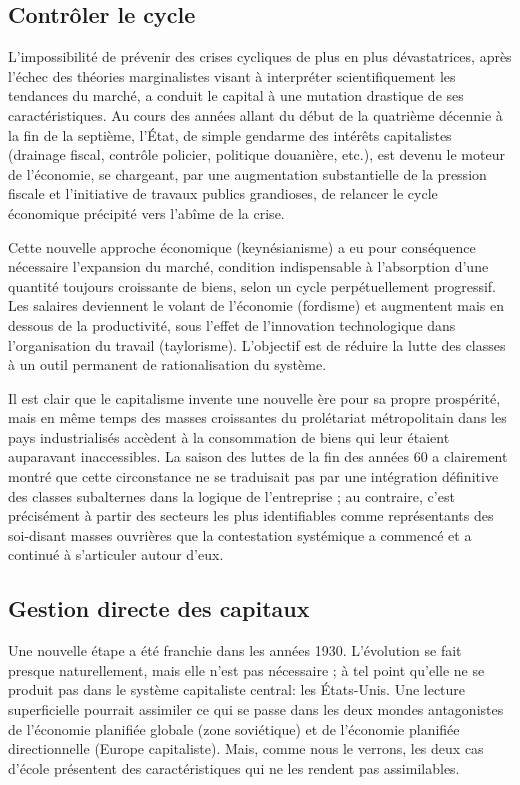 \subsection{Contrôler le cycle}

L'impossibilité de prévenir des crises cycliques de plus en plus dévastatrices, après l'échec des théories marginalistes visant à interpréter scientifiquement les tendances du marché, a conduit le capital à une mutation drastique de ses caractéristiques. Au cours des années allant du début de la quatrième décennie à la fin de la septième, l'État, de simple gendarme des intérêts capitalistes (drainage fiscal, contrôle policier, politique douanière, etc.), est devenu le moteur de l'économie, se chargeant, par une augmentation substantielle de la pression fiscale et l’initiative de travaux publics grandioses, de relancer le cycle économique précipité vers l'abîme de la crise.

Cette nouvelle approche économique (keynésianisme) a eu pour conséquence nécessaire l'expansion du marché, condition indispensable à l'absorption d'une quantité toujours croissante de biens, selon un cycle perpétuellement progressif. Les salaires deviennent le volant de l'économie (fordisme) et augmentent mais en dessous de la productivité, sous l'effet de l'innovation technologique dans l'organisation du travail (taylorisme). L'objectif est de réduire la lutte des classes à un outil permanent de rationalisation du système.

Il est clair que le capitalisme invente une nouvelle ère pour sa propre prospérité, mais en même temps des masses croissantes du prolétariat métropolitain dans les pays industrialisés accèdent à la consommation de biens qui leur étaient auparavant inaccessibles. La saison des luttes de la fin des années 60 a clairement montré que cette circonstance ne se traduisait pas par une intégration définitive des classes subalternes dans la logique de l'entreprise ; au contraire, c'est précisément à partir des secteurs les plus identifiables comme représentants des soi-disant masses ouvrières que la contestation systémique a commencé et a continué à s'articuler autour d'eux.

\subsection{Gestion directe des capitaux}

Une nouvelle étape a été franchie dans les années 1930. L'évolution se fait presque naturellement, mais elle n'est pas nécessaire ; à tel point qu'elle ne se produit pas dans le système capitaliste central: les États-Unis. Une lecture superficielle pourrait assimiler ce qui se passe dans les deux mondes antagonistes de l'économie planifiée globale (zone soviétique) et de l'économie planifiée directionnelle (Europe capitaliste). Mais, comme nous le verrons, les deux cas d'école présentent des caractéristiques qui ne les rendent pas assimilables.


